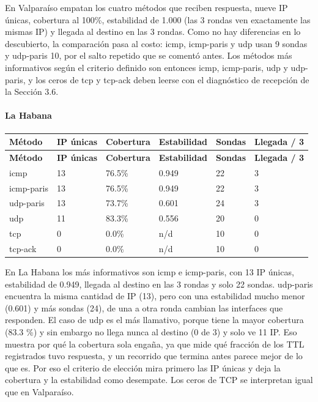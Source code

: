En Valparaíso empatan los cuatro métodos que reciben respuesta, nueve IP únicas, cobertura al 100\%, estabilidad de 1.000 (las 3 rondas ven exactamente las mismas IP) y llegada al destino en las 3 rondas. Como no hay diferencias en lo descubierto, la comparación pasa al costo: icmp, icmp-paris y udp usan 9 sondas y udp-paris 10, por el salto repetido que se comentó antes. Los métodos más informativos según el criterio definido son entonces icmp, icmp-paris, udp y udp-paris, y los ceros de tcp y tcp-ack deben leerse con el diagnóstico de recepción de la Sección 3.6.

\paragraph{La Habana}
\begingroup
\fontsize{9}{11}\selectfont
\addtocounter{table}{-1}
\begin{longtable}{p{3.1cm}p{1.9cm}p{2.1cm}p{2.1cm}p{1.8cm}p{2.1cm}}
\toprule
\textbf{Método} & \textbf{IP únicas} & \textbf{Cobertura} & \textbf{Estabilidad} & \textbf{Sondas} & \textbf{Llegada / 3} \\ \midrule
\endfirsthead
\toprule
\textbf{Método} & \textbf{IP únicas} & \textbf{Cobertura} & \textbf{Estabilidad} & \textbf{Sondas} & \textbf{Llegada / 3} \\ \midrule
\endhead
icmp & 13 & 76.5\% & 0.949 & 22 & 3 \\
icmp-paris & 13 & 76.5\% & 0.949 & 22 & 3 \\
udp-paris & 13 & 73.7\% & 0.601 & 24 & 3 \\
udp & 11 & 83.3\% & 0.556 & 20 & 0 \\
tcp & 0 & 0.0\% & n/d & 10 & 0 \\
tcp-ack & 0 & 0.0\% & n/d & 10 & 0 \\
\bottomrule
\end{longtable}
\endgroup



En La Habana los más informativos son icmp e icmp-paris, con 13 IP únicas, estabilidad de 0.949, llegada al destino en las 3 rondas y solo 22 sondas. udp-paris encuentra la misma cantidad de IP (13), pero con una estabilidad mucho menor (0.601) y más sondas (24), de una a otra ronda cambian las interfaces que responden. El caso de udp es el más llamativo, porque tiene la mayor cobertura (83.3 \%) y sin embargo no llega nunca al destino (0 de 3) y solo ve 11 IP. Eso muestra por qué la cobertura sola engaña, ya que mide qué fracción de los TTL registrados tuvo respuesta, y un recorrido que termina antes parece mejor de lo que es. Por eso el criterio de elección mira primero las IP únicas y deja la cobertura y la estabilidad como desempate. Los ceros de TCP se interpretan igual que en Valparaíso.

